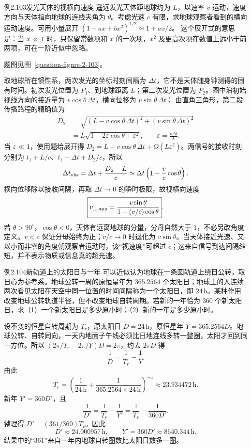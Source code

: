 \KinematicKeepSpace{12cm}
\begin{origexamplebox}{例2.103\quad 发光天体的视横向速度}
遥远发光天体距地球约为 $L$，以速率 $v$ 运动，速度方向与天体指向地球的连线夹角为 $\theta$。考虑光速 $c$ 有限，求地球观察者看到的横向运动速度。可用小量展开 $(1+ax+bx^2)^{1/2}\simeq1+ax/2$。
这个展开式的意思是：当 $x\ll1$ 时，只保留常数项和 $x$ 的一次项，$x^2$ 及更高次项在数值上远小于前两项，可在一阶近似中忽略。
\par 题图见图~\ref{question-figure-2-103}。
\KQuestionDZ
\end{origexamplebox}
\begin{xesolution}
取地球所在惯性系，两次发光的坐标时刻间隔为 $\Delta t$，它不是天体随身钟测得的固有时间。初次发光位置为 $P_1$、到地球距离 $L$；第二次发光位置为 $P_2$。图中沿初始视线方向的接近量为 $v\cos\theta\,\Delta t$，横向位移为 $v\sin\theta\,\Delta t$：
\ApparentTransverseDiagram
由直角三角形，第二段传播路程的精确值为
\begin{align*}
D_2&=\sqrt{(L-v\cos\theta\,\Delta t)^2+(v\sin\theta\,\Delta t)^2}\\
&=L\sqrt{1-2\varepsilon\cos\theta+\varepsilon^2},
\qquad \varepsilon=\frac{v\Delta t}{L}.
\end{align*}
当 $\varepsilon\ll1$，使用题给展开得 $D_2=L-v\cos\theta\,\Delta t+O(L\varepsilon^2)$。两信号的接收时刻分别为 $t_1+L/c$、$t_1+\Delta t+D_2/c$，所以
\[
\Delta t_{\rm obs}=\Delta t+\frac{D_2-L}{c}
\simeq\Delta t\left(1-\frac vc\cos\theta\right).
\]
横向位移除以接收间隔，再取 $\Delta t\to0$ 的瞬时极限，故视横向速度
\[
\boxed{v_{\perp,\rm app}=\frac{v\sin\theta}{1-(v/c)\cos\theta}}.
\]
若 $\theta>90^\circ$，$\cos\theta<0$，天体有远离地球的分量，分母自然大于 $1$，不必另改角度定义。$v<c$ 保证分母始终为正；$v/c\to0$ 时退化为 $v\sin\theta$。当天体接近光速、又以小而非零的角度朝观察者运动时，该“视速度”可超过 $c$；这来自信号到达间隔缩短，并不表示物质或信息真的超光速。
\end{xesolution}

\KinematicKeepSpace{8cm}
\begin{origexamplebox}{例2.104\quad 新轨道上的太阳日与一年}
可以近似认为地球在一条圆轨道上绕日公转，取日心为参考系。地球公转一周的原恒星年为 $365.2564$ 个太阳日；地球上的人连续两次看见太阳在天空中同一位置的时间间隔称为一个太阳日，即 $24\,\mathrm h$。某种作用改变地球公转轨道半径，但不改变地球自转周期。若新的一年恰为 $360$ 个新太阳日，求（1）一个新太阳日是多少原小时；（2）新的一年是多少原小时。
\end{origexamplebox}
\begin{xesolution}
设不变的恒星自转周期为 $T_r$，原太阳日 $D=24\,\mathrm h$，原恒星年 $Y=365.2564D$。地球公转、自转同向，一天内地面子午线必须比日地连线多转一整圈，太阳才回到同一方位。所以 $(2\pi/T_r-2\pi/Y)D=2\pi$，约去 $2\pi D$ 得
\[
\frac1D=\frac1{T_r}-\frac1Y.
\]
由此
\[
T_r=\left(\frac1{24\,\mathrm h}+\frac1{365.2564\times24\,\mathrm h}\right)^{-1}
\approx23.934472\,\mathrm h.
\]
新年 $Y'=360D'$，且
\[
\frac1{D'}=\frac1{T_r}-\frac1{Y'}
=\frac1{T_r}-\frac1{360D'}.
\]
整理得 $D'=(361/360)T_r$。因此
\[
\boxed{D'\approx24.000957\,\mathrm h},
\qquad
\boxed{Y'=360D'\approx8640.344\,\mathrm h}.
\]
结果中的“361”来自一年内地球自转圈数比太阳日数多一圈。
\end{xesolution}

